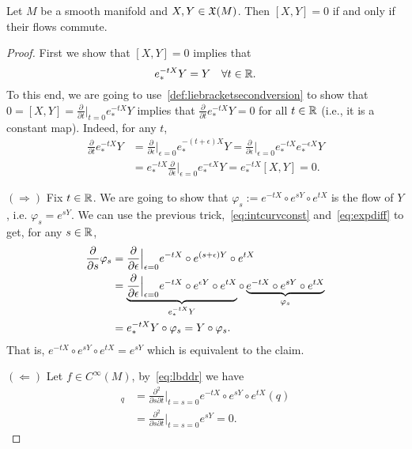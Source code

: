 \begin{proposition}
  Let $M$ be a smooth manifold and $X,Y\in\mathfrak{X}(M)$. Then $[X,Y]=0$ if and only if their flows commute.
\end{proposition}
\begin{proof}
  First we show that $[X,Y] = 0$ implies that
  \begin{equation}\label{eq:intcurvconst}
    e^{-tX}_*Y = Y \quad \forall t\in\mathbb{R}.
  \end{equation}
  To this end, we are going to use~\eqref{def:liebracketsecondversion} to show that $0 = [X,Y] = \frac{\partial}{\partial t}\Big|_{t=0} e_*^{-t X} Y$ implies that $\frac{\partial}{\partial t} e_*^{-t X} Y = 0$ for all $t\in\mathbb{R}$ (i.e., it is a constant map).
  Indeed, for any $t$,
  \begin{align}
    \frac{\partial}{\partial t} e_*^{-t X} Y
    &= \frac{\partial}{\partial \epsilon} \Big|_{\epsilon = 0} e_*^{-(t+\epsilon) X} Y
    = \frac{\partial}{\partial \epsilon} \Big|_{\epsilon = 0} e_*^{-t X}e_*^{-\epsilon X} Y\\
    &= e_*^{-tX} \frac{\partial}{\partial \epsilon} \Big|_{\epsilon = 0} e_*^{-\epsilon X} Y
    = e_*^{-tX} [X,Y] = 0.
  \end{align}
  
  $(\Longrightarrow)$ Fix $t\in\mathbb{R}$. We are going to show that $\varphi_s := e^{-tX}\circ e^{sY}\circ e^{tX}$ is the flow of $Y$, i.e. $\varphi_s = e^{sY}$.
  We can use the previous trick,~\eqref{eq:intcurvconst} and~\eqref{eq:expdiff} to get, for any $s\in\mathbb{R}$,
  \begin{align}
    \frac{\partial}{\partial s} \varphi_s
    &= \frac{\partial}{\partial \epsilon} \Big|_{\epsilon = 0} e^{-tX}\circ e^{(s+\epsilon) Y}\circ e^{tX} \\
    &= \LaTeXunderbrace{\frac{\partial}{\partial \epsilon} \Big|_{\epsilon = 0} e^{-tX}\circ e^{\epsilon Y}\circ e^{tX}}_{e^{-tX}_* Y} \circ \LaTeXunderbrace{e^{-tX}\circ e^{s Y}\circ e^{tX}}_{\varphi_s} \\
    &= e^{-tX}_* Y \circ \varphi_s = Y \circ \varphi_s.
  \end{align}
  That is, $e^{-tX}\circ e^{sY}\circ e^{tX} = e^{sY}$ which is equivalent to the claim.

  $(\Longleftarrow)$ Let $f\in C^\infty(M)$, by~\eqref{eq:lbddr} we have
  \begin{align}
    [X,Y]_q &= \frac{\partial^2}{\partial s \partial t}\Big|_{t=s=0}e^{-tX}\circ e^{sY}\circ e^{t X}(q)\\
    &= \frac{\partial^2}{\partial s \partial t}\Big|_{t=s=0} e^{sY} = 0.
  \end{align}
\end{proof}

